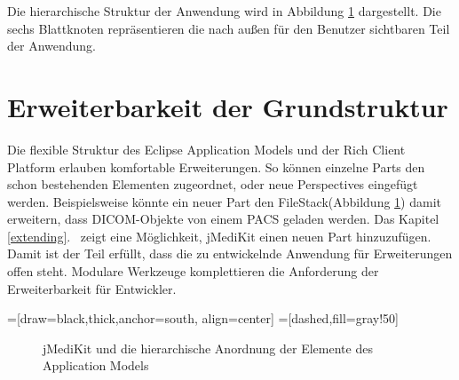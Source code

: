 Die hierarchische Struktur der Anwendung wird in Abbildung \ref{hierarchy} dargestellt. Die sechs Blattknoten repräsentieren die nach außen für den Benutzer sichtbaren Teil der Anwendung. 


\section{Erweiterbarkeit der Grundstruktur}
Die flexible Struktur des Eclipse Application Models und der Rich Client Platform erlauben komfortable Erweiterungen. So können einzelne Parts den schon bestehenden Elementen zugeordnet, oder neue Perspectives eingefügt werden. Beispielsweise könnte ein neuer Part den FileStack(Abbildung \ref{hierarchy}) damit erweitern, dass DICOM-Objekte von einem PACS geladen werden. Das Kapitel \glqq \ref{extending}. \grqq\ zeigt eine Möglichkeit, jMediKit einen neuen Part hinzuzufügen.\\
Damit ist der Teil erfüllt, dass die zu entwickelnde Anwendung für Erweiterungen offen steht. Modulare Werkzeuge komplettieren die Anforderung der Erweiterbarkeit für Entwickler.

=[draw=black,thick,anchor=south, align=center]
=[dashed,fill=gray!50]
\begin{figure}[htbp]
\centering
\caption{jMediKit und die hierarchische Anordnung der Elemente des Application Models}
\label{hierarchy}
\end{figure}

